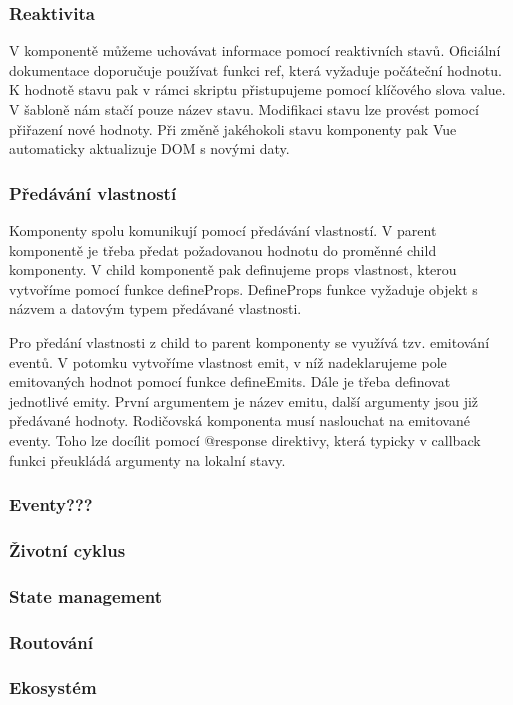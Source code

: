 \subsubsection{Reaktivita}

V komponentě můžeme uchovávat informace pomocí reaktivních stavů. Oficiální dokumentace doporučuje používat funkci ref, která vyžaduje počáteční hodnotu. 
K hodnotě stavu pak v rámci skriptu přistupujeme pomocí klíčového slova value. V šabloně nám stačí pouze název stavu. 
Modifikaci stavu lze provést pomocí přiřazení nové hodnoty. Při změně jakéhokoli stavu komponenty pak Vue automaticky aktualizuje DOM s novými daty.\cite{vue}

\subsubsection{Předávání vlastností}

Komponenty spolu komunikují pomocí předávání vlastností. V parent komponentě je třeba předat požadovanou hodnotu do proměnné child komponenty. 
V child komponentě pak definujeme props vlastnost, kterou vytvoříme pomocí funkce defineProps. 
DefineProps funkce vyžaduje objekt s názvem a datovým typem předávané vlastnosti.

Pro předání vlastnosti z child to parent komponenty se využívá tzv. emitování eventů. 
V potomku vytvoříme vlastnost emit, v níž nadeklarujeme pole emitovaných hodnot pomocí funkce defineEmits. Dále je třeba definovat jednotlivé emity. 
První argumentem je název emitu, další argumenty jsou již předávané hodnoty. Rodičovská komponenta musí naslouchat na emitované eventy. 
Toho lze docílit pomocí @response direktivy, která typicky v callback funkci přeukládá argumenty na lokalní stavy.\cite{vuemacrae,vue}

\subsubsection{Eventy???}
\subsubsection{Životní cyklus}
\subsubsection{State management}
\subsubsection{Routování}
\subsubsection{Ekosystém}